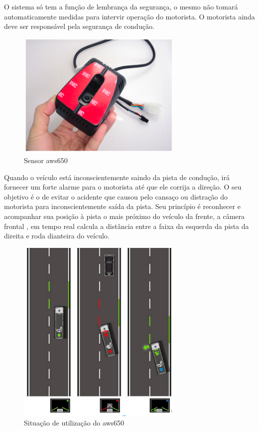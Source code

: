 O sistema só tem a função de lembrança da segurança, o mesmo não tomará automaticamente medidas para intervir operação do motorista. O motorista ainda deve ser responsável pela segurança de condução.

\begin{figure}[h]
  \centering
  \includegraphics[width=300px, scale=0.5]{figuras/sensoraws650}
  \caption{Sensor aws650}
  \label{fig:sensoraws650}
\end{figure}

Quando o veículo está inconscientemente saindo da pista de condução, irá fornecer um forte alarme para o motorista até que ele corrija a direção. O seu objetivo é o de evitar o acidente que causou pelo cansaço ou distração do motorista para inconscientemente saída da pista. Seu princípio é reconhecer e acompanhar sua posição à pista o mais próximo do veículo da frente, a câmera frontal , em tempo real calcula a distância entre a faixa da esquerda da  pista da direita e roda dianteira do veículo.

\begin{figure}[h]
  \centering
  \includegraphics[width=300px, scale=0.5]{figuras/situacaoPerigo}
  \caption{Situação de utilização do aws650}
  \label{fig:situacaoPerigo}
\end{figure}

